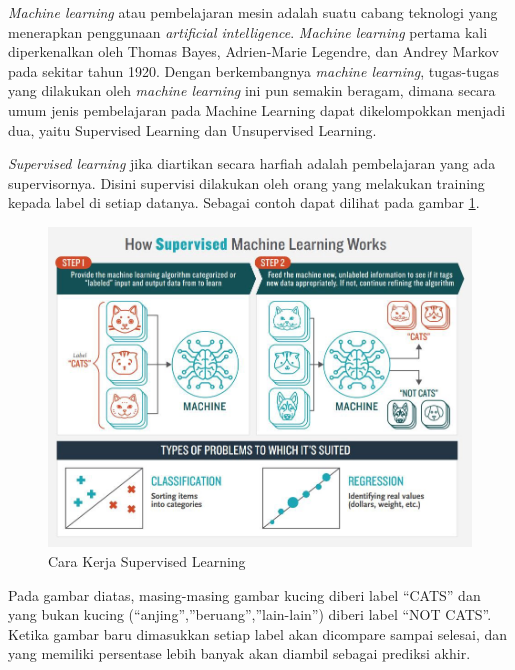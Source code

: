 \textit{Machine learning} atau pembelajaran mesin adalah suatu cabang teknologi yang menerapkan penggunaan \textit{artificial intelligence}. \textit{Machine learning} pertama kali diperkenalkan oleh Thomas Bayes, Adrien-Marie Legendre, dan Andrey Markov pada sekitar tahun 1920\cite{cit:7}. Dengan berkembangnya \textit{machine learning}, tugas-tugas yang dilakukan oleh \textit{machine learning} ini pun semakin beragam, dimana secara umum jenis pembelajaran pada Machine Learning dapat dikelompokkan menjadi dua, yaitu Supervised Learning dan Unsupervised Learning.

\vspace{1ex}
\par \textit{Supervised learning} jika diartikan secara harfiah adalah pembelajaran yang ada supervisornya. Disini supervisi dilakukan oleh orang yang melakukan training kepada label di setiap datanya. Sebagai contoh dapat dilihat pada gambar \ref{fig:2.1}. 
\vspace{1ex}

\begin{figure} [!htb]
	\centering
	\includegraphics[scale=0.16]{img/supervised.jpeg}
	\caption{Cara Kerja Supervised Learning\cite{cit:8}}
	\label{fig:2.1}
\end{figure}

\par Pada gambar diatas, masing-masing gambar kucing diberi label “CATS” dan yang bukan kucing (“anjing”,”beruang”,”lain-lain”) diberi label “NOT CATS”. Ketika gambar baru dimasukkan setiap label akan dicompare sampai selesai, dan yang memiliki persentase lebih banyak akan diambil sebagai prediksi akhir.

